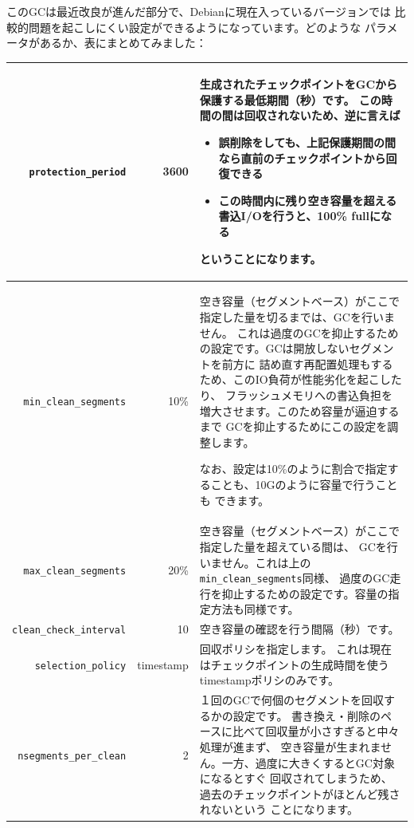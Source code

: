 \documentclass[mingoth,a4paper]{jsarticle}
\begin{document}
このGCは最近改良が進んだ部分で、Debianに現在入っているバージョンでは
比較的問題を起こしにくい設定ができるようになっています。どのような
パラメータがあるか、表にまとめてみました：
\begin{center}
\begin{supertabular}[h]{|r|r|p{30em}|}
\verb|protection_period| & 3600 &
生成されたチェックポイントをGCから保護する最低期間（秒）です。
この時間の間は回収されないため、逆に言えば
\begin{itemize}
\item 誤削除をしても、上記保護期間の間なら直前のチェックポイントから回復できる
\item この時間内に残り空き容量を超える書込I/Oを行うと、100\% fullになる
\end{itemize}
ということになります。 \\ \hline

\verb|min_clean_segments| & 10\% &
空き容量（セグメントベース）がここで指定した量を切るまでは、GCを行いません。
これは過度のGCを抑止するための設定です。GCは開放しないセグメントを前方に
詰め直す再配置処理もするため、このIO負荷が性能劣化を起こしたり、
フラッシュメモリへの書込負担を増大させます。このため容量が逼迫するまで
GCを抑止するためにこの設定を調整します。

なお、設定は10\%のように割合で指定することも、10Gのように容量で行うことも
できます。 \\ \hline

\verb|max_clean_segments| & 20\% &
空き容量（セグメントベース）がここで指定した量を超えている間は、
GCを行いません。これは上の\verb|min_clean_segments|同様、
過度のGC走行を抑止するための設定です。容量の指定方法も同様です。 \\ \hline

\verb|clean_check_interval| & 10 &
空き容量の確認を行う間隔（秒）です。 \\ \hline

\verb|selection_policy| & timestamp &
回収ポリシを指定します。
これは現在はチェックポイントの生成時間を使うtimestampポリシのみです。 \\ \hline

\verb|nsegments_per_clean| & 2 &
１回のGCで何個のセグメントを回収するかの設定です。
書き換え・削除のペースに比べて回収量が小さすぎると中々処理が進まず、
空き容量が生まれません。一方、過度に大きくするとGC対象になるとすぐ
回収されてしまうため、過去のチェックポイントがほとんど残されないという
ことになります。 \\ \hline


\end{supertabular}
\end{center}
\end{document}
